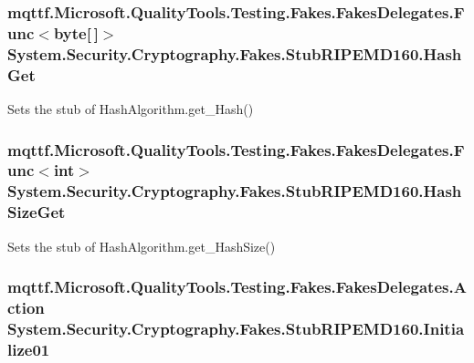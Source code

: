 \hypertarget{class_system_1_1_security_1_1_cryptography_1_1_fakes_1_1_stub_r_i_p_e_m_d160_ae10c075a7130c945b0db4df668905be4}{
\subsubsection[{Hash\-Get}]{\setlength{\rightskip}{0pt plus 5cm}mqttf.\-Microsoft.\-Quality\-Tools.\-Testing.\-Fakes.\-Fakes\-Delegates.\-Func$<$byte\mbox{[}$\,$\mbox{]}$>$ System.\-Security.\-Cryptography.\-Fakes.\-Stub\-R\-I\-P\-E\-M\-D160.\-Hash\-Get}}\label{class_system_1_1_security_1_1_cryptography_1_1_fakes_1_1_stub_r_i_p_e_m_d160_ae10c075a7130c945b0db4df668905be4}


Sets the stub of Hash\-Algorithm.\-get\-\_\-\-Hash()

\hypertarget{class_system_1_1_security_1_1_cryptography_1_1_fakes_1_1_stub_r_i_p_e_m_d160_a20f46e39167e82faf8ec1f3a17d045f3}{
\subsubsection[{Hash\-Size\-Get}]{\setlength{\rightskip}{0pt plus 5cm}mqttf.\-Microsoft.\-Quality\-Tools.\-Testing.\-Fakes.\-Fakes\-Delegates.\-Func$<$int$>$ System.\-Security.\-Cryptography.\-Fakes.\-Stub\-R\-I\-P\-E\-M\-D160.\-Hash\-Size\-Get}}\label{class_system_1_1_security_1_1_cryptography_1_1_fakes_1_1_stub_r_i_p_e_m_d160_a20f46e39167e82faf8ec1f3a17d045f3}


Sets the stub of Hash\-Algorithm.\-get\-\_\-\-Hash\-Size()

\hypertarget{class_system_1_1_security_1_1_cryptography_1_1_fakes_1_1_stub_r_i_p_e_m_d160_a18cb9c2038637738dc3f27ab925c5a17}{
\subsubsection[{Initialize01}]{\setlength{\rightskip}{0pt plus 5cm}mqttf.\-Microsoft.\-Quality\-Tools.\-Testing.\-Fakes.\-Fakes\-Delegates.\-Action System.\-Security.\-Cryptography.\-Fakes.\-Stub\-R\-I\-P\-E\-M\-D160.\-Initialize01}}\label{class_system_1_1_security_1_1_cryptography_1_1_fakes_1_1_stub_r_i_p_e_m_d160_a18cb9c2038637738dc3f27ab925c5a17}


